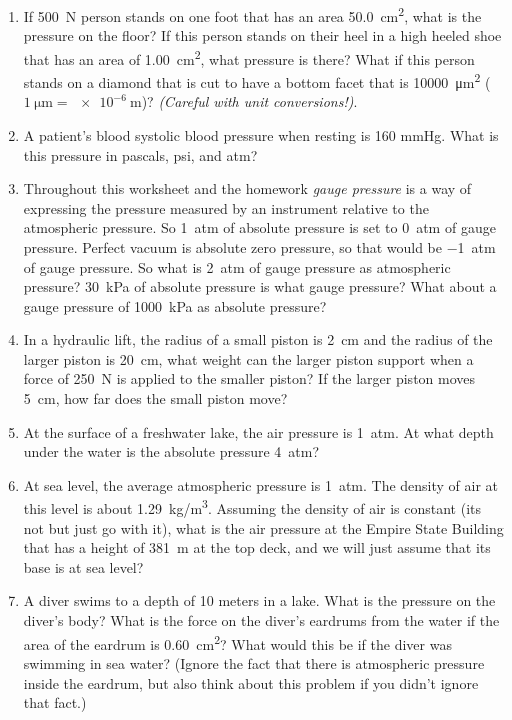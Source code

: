 \begin{enumerate}
	\setlength\itemsep{2 in}
	
	\item If \SI{500}{N} person stands on one foot that has an area \SI{50.0}{cm^2}, what is the pressure on the floor? If this person stands on their heel in a high heeled shoe that has an area of \SI{1.00}{cm^2}, what pressure is there? What if this person stands on a diamond that is cut to have a bottom facet that is \SI{10000}{\micro\meter^2} ($\SI{1}{\micro\meter}=\SI{e-6}{\meter}$)? \emph{(Careful with unit conversions!)}.
	
	\item
	A patient's blood systolic blood pressure when resting is 160 mmHg. What is this pressure in pascals, psi, and atm?
	
	\item
	Throughout this worksheet and the homework \emph{gauge pressure} is a way of expressing the pressure measured by an instrument relative to the atmospheric pressure. So \SI{1}{atm} of absolute pressure is set to \SI{0}{atm} of gauge pressure. Perfect vacuum is absolute zero pressure, so that would be \SI{-1}{atm} of gauge pressure. So what is \SI{2}{atm} of gauge pressure as atmospheric pressure? \SI{30}{\kilo\pascal} of absolute pressure is what gauge pressure? What about a gauge pressure of \SI{1000}{\kilo\pascal} as absolute pressure?
	
	\item
	In a hydraulic lift, the radius of a small piston is \SI{2}{cm} and the radius of the larger piston is \SI{20}{cm}, what weight can the larger piston support when a force of \SI{250}{N} is applied to the smaller piston? If the larger piston moves \SI{5}{cm}, how far does the small piston move?
	
	\item
	At the surface of a freshwater lake, the air pressure is \SI{1}{atm}. At what depth under the water is the absolute pressure \SI{4}{atm}?
	
	\item 
	At sea level, the average atmospheric pressure is \SI{1}{atm}. The density of air at this level is about \SI{1.29}{kg/m^3}. Assuming the density of air is constant (its not but just go with it), what is the air pressure at the Empire State Building that has a height of \SI{381}{\meter} at the top deck, and we will just assume that its base is at sea level?
	
	\item 
	A diver swims to a depth of 10 meters in a lake. What is the pressure on the diver's body? What is the force on the diver's eardrums from the water if the area of the eardrum is \SI{0.60}{cm^2}? What would this be if the diver was swimming in sea water? (Ignore the fact that there is atmospheric pressure inside the eardrum, but also think about this problem if you didn't ignore that fact.)
	

\end{enumerate}
